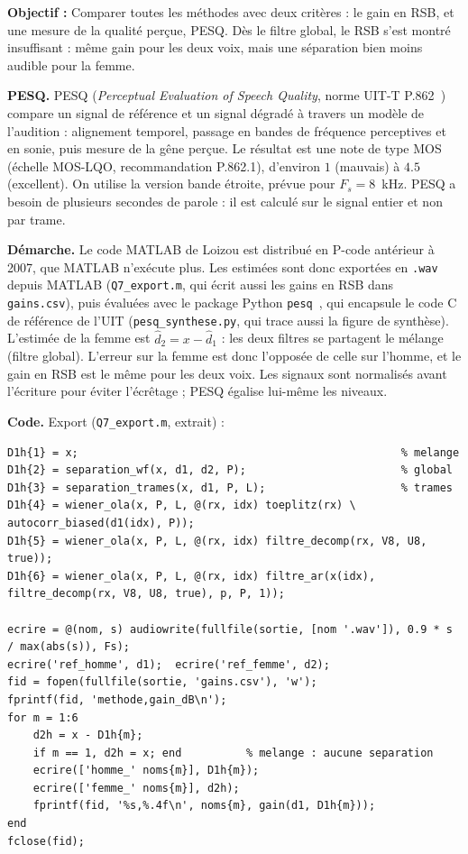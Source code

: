 \begin{enonce}
\textbf{Objectif :} Comparer toutes les méthodes avec deux critères : le gain en RSB, et une mesure de la qualité perçue, PESQ. Dès le filtre global, le RSB s'est montré insuffisant : même gain pour les deux voix, mais une séparation bien moins audible pour la femme.
\end{enonce}

\textbf{PESQ.} PESQ (\emph{Perceptual Evaluation of Speech Quality}, norme UIT-T P.862~\cite{p862}) compare un signal de référence et un signal dégradé à travers un modèle de l'audition : alignement temporel, passage en bandes de fréquence perceptives et en sonie, puis mesure de la gêne perçue. Le résultat est une note de type MOS (échelle MOS-LQO, recommandation P.862.1), d'environ $1$ (mauvais) à $4.5$ (excellent). On utilise la version bande étroite, prévue pour $F_s=8$~kHz. PESQ a besoin de plusieurs secondes de parole : il est calculé sur le signal entier et non par trame.

\textbf{Démarche.} Le code MATLAB de Loizou est distribué en P-code antérieur à 2007, que MATLAB n'exécute plus. Les estimées sont donc exportées en \texttt{.wav} depuis MATLAB (\texttt{Q7\_export.m}, qui écrit aussi les gains en RSB dans \texttt{gains.csv}), puis évaluées avec le package Python \texttt{pesq}~\cite{pesqpy}, qui encapsule le code C de référence de l'UIT (\texttt{pesq\_synthese.py}, qui trace aussi la figure de synthèse). L'estimée de la femme est $\hat d_2=x-\hat d_1$ : les deux filtres se partagent le mélange (filtre global). L'erreur sur la femme est donc l'opposée de celle sur l'homme, et le gain en RSB est le même pour les deux voix. Les signaux sont normalisés avant l'écriture pour éviter l'écrêtage ; PESQ égalise lui-même les niveaux.

\textbf{Code.} Export (\texttt{Q7\_export.m}, extrait) :
\begin{lstlisting}
D1h{1} = x;                                                  % melange
D1h{2} = separation_wf(x, d1, d2, P);                        % global
D1h{3} = separation_trames(x, d1, P, L);                     % trames
D1h{4} = wiener_ola(x, P, L, @(rx, idx) toeplitz(rx) \ autocorr_biased(d1(idx), P));
D1h{5} = wiener_ola(x, P, L, @(rx, idx) filtre_decomp(rx, V8, U8, true));
D1h{6} = wiener_ola(x, P, L, @(rx, idx) filtre_ar(x(idx), filtre_decomp(rx, V8, U8, true), p, P, 1));

ecrire = @(nom, s) audiowrite(fullfile(sortie, [nom '.wav']), 0.9 * s / max(abs(s)), Fs);
ecrire('ref_homme', d1);  ecrire('ref_femme', d2);
fid = fopen(fullfile(sortie, 'gains.csv'), 'w');
fprintf(fid, 'methode,gain_dB\n');
for m = 1:6
    d2h = x - D1h{m};
    if m == 1, d2h = x; end          % melange : aucune separation
    ecrire(['homme_' noms{m}], D1h{m});
    ecrire(['femme_' noms{m}], d2h);
    fprintf(fid, '%s,%.4f\n', noms{m}, gain(d1, D1h{m}));
end
fclose(fid);
\end{lstlisting}

